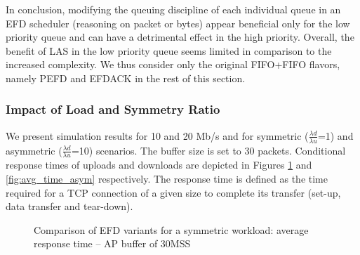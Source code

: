 \documentclass[preprint,12pt]{elsarticle}
\begin{document}
In conclusion, modifying the queuing discipline of each individual queue in an EFD scheduler (reasoning on packet or bytes) appear beneficial only for the low priority queue and can have a detrimental effect in the high priority. Overall, the benefit of LAS in the low priority queue seems limited in comparison to the increased complexity. We thus consider only the original FIFO+FIFO flavors, namely PEFD and EFDACK in the rest of this section.

\subsubsection{Impact of Load and Symmetry Ratio} \label{section:response_time}

We present simulation results for 10 and 20 Mb/s and for symmetric ($\frac{\lambda{d}}{\lambda{u}}$=1) and asymmetric ($\frac{\lambda{d}}{\lambda{u}}$=10) scenarios. The buffer size is set to 30 packets. Conditional response times of uploads and downloads are depicted in Figures \ref{fig:avg_time_sym} and \ref{fig:avg_time_asym} respectively. The response time is defined as the time required for a TCP connection of a given size to complete its transfer (set-up, data transfer and tear-down). 


\begin{figure}[ht!]
  \centering
  \caption{Comparison of EFD variants for a symmetric workload: average response time --  AP buffer of 30MSS}
  \label{fig:avg_time_sym}
\end{figure}
\end{document}
